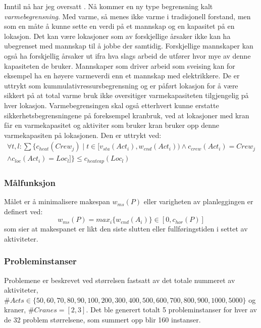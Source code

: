 Inntil nå har jeg oversatt \cite{tvedtbezem}. Nå kommer en ny type begrensning kalt \textit{varmebegrensning}. Med varme, så menes ikke varme i tradisjonell forstand, men som en måte å kunne sette en verdi på et mannskap og en kapasitet på en lokasjon. Det kan være lokasjoner som av forskjellige årsaker ikke kan ha ubegrenset med mannskap til å jobbe der samtidig. Forskjellige mannskaper kan også ha forskjellig årsaker ut ifra hva slags arbeid de utfører hvor mye av denne kapasiteten de bruker. Mannskaper som driver arbeid som sveising kan for eksempel ha en høyere varmeverdi enn et mannskap med elektrikkere. De er uttrykt som kummulativressursbegrensning og er påført lokasjon for å være sikkert på at total varme bruk ikke oversitiger varmekapasiteten tilgjengelig på hver lokasjon. Varmebegrensingen skal også etterhvert kunne erstatte sikkerhetsbegrensningene på foreksempel kranbruk, ved at lokasjoner med kran får en varmekapasitet og aktiviter som bruker kran bruker opp denne varmekapasiten på lokasjonen. Den er uttrykt ved:
\begin{equation}
\begin{split}
\forall t,l: \sum\{c_{heat}(Crew_j) \mid t \in [ v_{sta}(Act_{i}), w_{end}(Act_{i})) \wedge c_{crew}(Act_{i}) = Crew_{j} \\
\wedge c_{loc}(Act_{i}) = Loc_{l} ] \} \le c_{heatcap}(Loc_{l})
\end{split}
\end{equation}

\subsubsection{Målfunksjon}
Målet er å minimalisere makespan $ w_{ms}(P) $ eller varigheten av planleggingen er definert ved:
\begin{equation}
w_{ms}(P) = max_{i} \{ w_{end}(A_{i}) \} \in [0,c_{hor}(P)]
\end{equation}
som sier at makespanet er likt den siste slutten eller fullføringstiden i settet av aktiviteter.

\subsubsection{Probleminstanser}
Problemene er beskrevet ved størrelsen fastsatt av det totale nummeret av aktiviteter, $ \#Acts \in \{ 50,60, 70, 80, 90, 100, 200, 300, 400, 500, 600, 700, 800, 900, 1000, 5000 \} $ og kraner, $ \#Cranes = [2,3] $. Det ble generert totalt 5 probleminstanser for hver av de 32 problem størrelsene, som summert opp blir 160 instanser.

